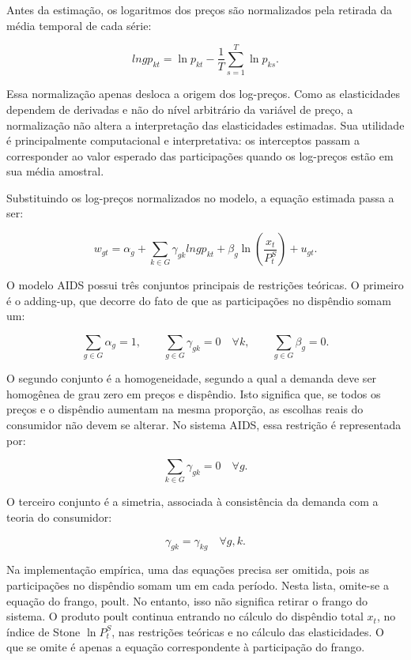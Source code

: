\documentclass[12pt,a4paper]{article}
\begin{document}
Antes da estimação, os logaritmos dos preços são normalizados pela retirada da média temporal de cada série:

\[
lngp_{kt}
=
\ln p_{kt}
-
\frac{1}{T}
\sum_{s=1}^{T}
\ln p_{ks}.
\tag{8}
\label{eq:normalizacao_precos}
\]

Essa normalização apenas desloca a origem dos log-preços. Como as elasticidades dependem de derivadas e não do nível arbitrário da variável de preço, a normalização não altera a interpretação das elasticidades estimadas. Sua utilidade é principalmente computacional e interpretativa: os interceptos passam a corresponder ao valor esperado das participações quando os log-preços estão em sua média amostral.

Substituindo os log-preços normalizados no modelo, a equação estimada passa a ser:

\[
w_{gt}
=
\alpha_g
+
\sum_{k \in G}
\gamma_{gk}lngp_{kt}
+
\beta_g
\ln
\left(
\frac{x_t}{P_t^S}
\right)
+
u_{gt}.
\tag{9}
\label{eq:aids_estimado}
\]

O modelo AIDS possui três conjuntos principais de restrições teóricas. O primeiro é o adding-up, que decorre do fato de que as participações no dispêndio somam um:

\[
\sum_{g \in G}\alpha_g = 1,
\qquad
\sum_{g \in G}\gamma_{gk}=0
\quad \forall k,
\qquad
\sum_{g \in G}\beta_g = 0.
\tag{10}
\label{eq:adding_up}
\]

O segundo conjunto é a homogeneidade, segundo a qual a demanda deve ser homogênea de grau zero em preços e dispêndio. Isto significa que, se todos os preços e o dispêndio aumentam na mesma proporção, as escolhas reais do consumidor não devem se alterar. No sistema AIDS, essa restrição é representada por:

\[
\sum_{k \in G}
\gamma_{gk}
=
0
\quad
\forall g.
\tag{11}
\label{eq:homogeneidade}
\]

O terceiro conjunto é a simetria, associada à consistência da demanda com a teoria do consumidor:

\[
\gamma_{gk}
=
\gamma_{kg}
\quad
\forall g,k.
\tag{12}
\label{eq:simetria}
\]

Na implementação empírica, uma das equações precisa ser omitida, pois as participações no dispêndio somam um em cada período. Nesta lista, omite-se a equação do frango, \(\text{poult}\). No entanto, isso não significa retirar o frango do sistema. O produto \(\text{poult}\) continua entrando no cálculo do dispêndio total \(x_t\), no índice de Stone \(\ln P_t^S\), nas restrições teóricas e no cálculo das elasticidades. O que se omite é apenas a equação correspondente à participação do frango.
\end{document}
